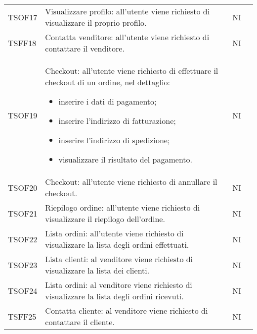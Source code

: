 \begin{center}
\begin{longtable}[!h]{p{50px} p{245px} p{75px} p{50px}}
        TSOF17                           & Visualizzare profilo: all'utente viene richiesto di visualizzare il proprio profilo.                                                                                & NI             \\
        TSFF18                           & Contatta venditore: all'utente viene richiesto di contattare il venditore.                                                                                          & NI             \\
        TSOF19                           & Checkout: all'utente viene richiesto di effettuare il checkout di un ordine, nel dettaglio: \begin{itemize} \item inserire i dati di pagamento; \item inserire l'indirizzo di fatturazione; \item inserire l'indirizzo di spedizione; \item visualizzare il risultato del pagamento. \end{itemize}                                             & NI             \\
        TSOF20                           & Checkout: all'utente viene richiesto di annullare il checkout.                                                                                                      & NI             \\
        TSOF21                           & Riepilogo ordine: all'utente viene richiesto di visualizzare il riepilogo dell'ordine.                                                                              & NI             \\
        TSOF22                           & Lista ordini: all'utente viene richiesto di visualizzare la lista degli ordini effettuati.                                                                          & NI             \\
        TSOF23                           & Lista clienti: al venditore viene richiesto di visualizzare la lista dei clienti.                                                                                   & NI             \\
        TSOF24                           & Lista ordini: al venditore viene richiesto di visualizzare la lista degli ordini ricevuti.                                                                          & NI             \\
        TSFF25                           & Contatta cliente: al venditore viene richiesto di contattare il cliente.                                                                                            & NI             \\

\end{longtable}
\end{center}
